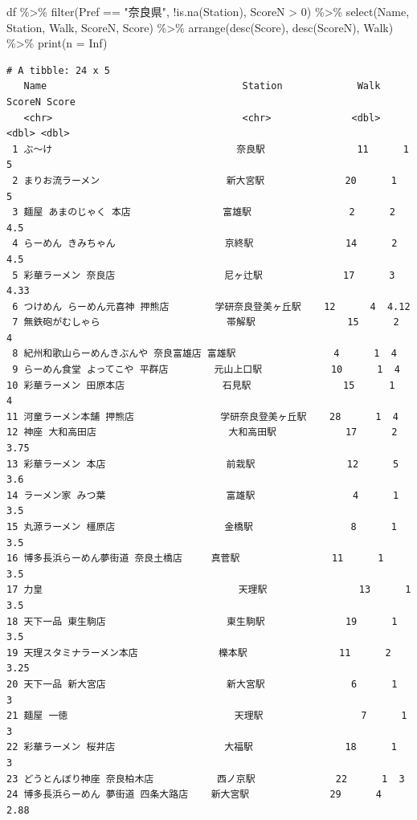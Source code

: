 \documentclass[
  a4paper,
  pandoc,
  ja=standard,
  jafont=haranoaji]{bxjsbook}
\newenvironment{Shaded}{\begin{snugshade}}{\end{snugshade}}
\newcommand{\AttributeTok}[1]{\textcolor[rgb]{0.00,0.48,0.65}{#1}}
\newcommand{\ConstantTok}[1]{\textcolor[rgb]{0.56,0.35,0.01}{#1}}
\newcommand{\DecValTok}[1]{\textcolor[rgb]{0.68,0.00,0.00}{#1}}
\newcommand{\FunctionTok}[1]{\textcolor[rgb]{0.28,0.35,0.67}{#1}}
\newcommand{\NormalTok}[1]{\textcolor[rgb]{0.00,0.48,0.65}{#1}}
\newcommand{\SpecialCharTok}[1]{\textcolor[rgb]{0.37,0.37,0.37}{#1}}
\newcommand{\StringTok}[1]{\textcolor[rgb]{0.13,0.47,0.30}{#1}}
\begin{document}
\begin{Shaded}
\begin{Highlighting}[numbers=left,,]
\NormalTok{df }\SpecialCharTok{\%\textgreater{}\%}
  \FunctionTok{filter}\NormalTok{(Pref }\SpecialCharTok{==} \StringTok{"奈良県"}\NormalTok{, }\SpecialCharTok{!}\FunctionTok{is.na}\NormalTok{(Station), ScoreN }\SpecialCharTok{\textgreater{}} \DecValTok{0}\NormalTok{) }\SpecialCharTok{\%\textgreater{}\%}
  \FunctionTok{select}\NormalTok{(Name, Station, Walk, ScoreN, Score) }\SpecialCharTok{\%\textgreater{}\%}
  \FunctionTok{arrange}\NormalTok{(}\FunctionTok{desc}\NormalTok{(Score), }\FunctionTok{desc}\NormalTok{(ScoreN), Walk) }\SpecialCharTok{\%\textgreater{}\%}
  \FunctionTok{print}\NormalTok{(}\AttributeTok{n =} \ConstantTok{Inf}\NormalTok{)}
\end{Highlighting}
\end{Shaded}

\begin{verbatim}
# A tibble: 24 x 5
   Name                                  Station             Walk ScoreN Score
   <chr>                                 <chr>              <dbl>  <dbl> <dbl>
 1 ぶ～け                                奈良駅                11      1  5   
 2 まりお流ラーメン                      新大宮駅              20      1  5   
 3 麺屋 あまのじゃく 本店                富雄駅                 2      2  4.5 
 4 らーめん きみちゃん                   京終駅                14      2  4.5 
 5 彩華ラーメン 奈良店                   尼ヶ辻駅              17      3  4.33
 6 つけめん らーめん元喜神 押熊店        学研奈良登美ヶ丘駅    12      4  4.12
 7 無鉄砲がむしゃら                      帯解駅                15      2  4   
 8 紀州和歌山らーめんきぶんや 奈良富雄店 富雄駅                 4      1  4   
 9 らーめん食堂 よってこや 平群店        元山上口駅            10      1  4   
10 彩華ラーメン 田原本店                 石見駅                15      1  4   
11 河童ラーメン本舗 押熊店               学研奈良登美ヶ丘駅    28      1  4   
12 神座 大和高田店                       大和高田駅            17      2  3.75
13 彩華ラーメン 本店                     前栽駅                12      5  3.6 
14 ラーメン家 みつ葉                     富雄駅                 4      1  3.5 
15 丸源ラーメン 橿原店                   金橋駅                 8      1  3.5 
16 博多長浜らーめん夢街道 奈良土橋店     真菅駅                11      1  3.5 
17 力皇                                  天理駅                13      1  3.5 
18 天下一品 東生駒店                     東生駒駅              19      1  3.5 
19 天理スタミナラーメン本店              櫟本駅                11      2  3.25
20 天下一品 新大宮店                     新大宮駅               6      1  3   
21 麺屋 一徳                             天理駅                 7      1  3   
22 彩華ラーメン 桜井店                   大福駅                18      1  3   
23 どうとんぼり神座 奈良柏木店           西ノ京駅              22      1  3   
24 博多長浜らーめん 夢街道 四条大路店    新大宮駅              29      4  2.88
\end{verbatim}
\end{document}
